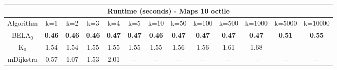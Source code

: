 \begin{tabular}{c|cccccccccccc}\toprule
\multicolumn{13}{c}{Runtime (seconds) - Maps 10 octile}\\ \midrule
Algorithm & k=1 & k=2 & k=3 & k=4 & k=5 & k=10 & k=50 & k=100 & k=500 & k=1000 & k=5000 & k=10000 \\ \midrule
BELA$_0$ & \textbf{0.46} & \textbf{0.46} & \textbf{0.46} & \textbf{0.47} & \textbf{0.47} & \textbf{0.46} & \textbf{0.47} & \textbf{0.47} & \textbf{0.47} & \textbf{0.47} & \textbf{0.51} & \textbf{0.55} \\
K$_0$ & 1.54 & 1.54 & 1.55 & 1.55 & 1.55 & 1.55 & 1.56 & 1.56 & 1.61 & 1.68 & -- & -- \\
mDijkstra & 0.57 & 1.07 & 1.53 & 2.01 & -- & -- & -- & -- & -- & -- & -- & -- \\ \bottomrule 
\end{tabular}
